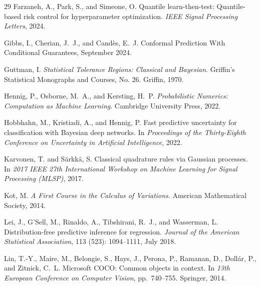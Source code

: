 \documentclass{article} %
\theoremstyle{remark}
\theoremstyle{definition}      %
\begin{document}
\begin{thebibliography}{29}
Farzaneh, A., Park, S., and Simeone, O.
\newblock Quantile learn-then-test: Quantile-based risk control for
  hyperparameter optimization.
\newblock \emph{IEEE Signal Processing Letters}, 2024.

Gibbs, I., Cherian, J.~J., and Cand{\`e}s, E.~J.
\newblock Conformal {{Prediction With Conditional Guarantees}}, September 2024.

Guttman, I.
\newblock \emph{Statistical Tolerance Regions: Classical and {{Bayesian}}}.
\newblock Griffin's Statistical Monographs and Courses, No. 26. Griffin, 1970.

Hennig, P., Osborne, M.~A., and Kersting, H.~P.
\newblock \emph{Probabilistic Numerics: Computation as Machine Learning}.
\newblock Cambridge University Press, 2022.

Hobbhahn, M., Kristiadi, A., and Hennig, P.
\newblock Fast predictive uncertainty for classification with {{Bayesian}} deep
  networks.
\newblock In \emph{Proceedings of the Thirty-Eighth Conference on Uncertainty
  in Artificial Intelligence}, 2022.

Karvonen, T. and S{\"a}rkk{\"a}, S.
\newblock Classical quadrature rules via {{Gaussian}} processes.
\newblock In \emph{2017 {{IEEE}} 27th International Workshop on Machine
  Learning for Signal Processing ({{MLSP}})}, 2017.

Kot, M.
\newblock \emph{A First Course in the Calculus of Variations}.
\newblock American Mathematical Society, 2014.

Lei, J., G'Sell, M., Rinaldo, A., Tibshirani, R.~J., and Wasserman, L.
\newblock Distribution-free predictive inference for regression.
\newblock \emph{Journal of the American Statistical Association}, 113
  (523): 1094--1111, July 2018.

Lin, T.-Y., Maire, M., Belongie, S., Hays, J., Perona, P., Ramanan, D.,
  Doll{\'a}r, P., and Zitnick, C.~L.
\newblock Microsoft {COCO}: Common objects in context.
\newblock In \emph{13th European Conference on Computer Vision}, pp.\
  740--755. Springer, 2014.


\end{thebibliography}
\end{document}
